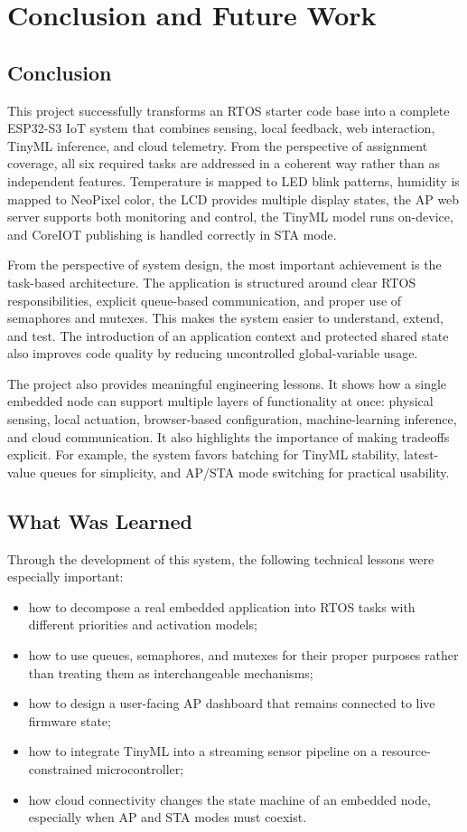 \section{Conclusion and Future Work}

\subsection{Conclusion}
This project successfully transforms an RTOS starter code base into a complete
ESP32-S3 IoT system that combines sensing, local feedback, web interaction,
TinyML inference, and cloud telemetry. From the perspective of assignment
coverage, all six required tasks are addressed in a coherent way rather than as
independent features. Temperature is mapped to LED blink patterns, humidity is
mapped to NeoPixel color, the LCD provides multiple display states, the AP web
server supports both monitoring and control, the TinyML model runs on-device,
and CoreIOT publishing is handled correctly in STA mode.

From the perspective of system design, the most important achievement is the
task-based architecture. The application is structured around clear RTOS
responsibilities, explicit queue-based communication, and proper use of
semaphores and mutexes. This makes the system easier to understand, extend, and
test. The introduction of an application context and protected shared state also
improves code quality by reducing uncontrolled global-variable usage.

The project also provides meaningful engineering lessons. It shows how a single
embedded node can support multiple layers of functionality at once: physical
sensing, local actuation, browser-based configuration, machine-learning
inference, and cloud communication. It also highlights the importance of making
tradeoffs explicit. For example, the system favors batching for TinyML
stability, latest-value queues for simplicity, and AP/STA mode switching for
practical usability.

\subsection{What Was Learned}
Through the development of this system, the following technical lessons were
especially important:
\begin{itemize}
  \item how to decompose a real embedded application into RTOS tasks with
  different priorities and activation models;
  \item how to use queues, semaphores, and mutexes for their proper purposes
  rather than treating them as interchangeable mechanisms;
  \item how to design a user-facing AP dashboard that remains connected to live
  firmware state;
  \item how to integrate TinyML into a streaming sensor pipeline on a resource-
  constrained microcontroller;
  \item how cloud connectivity changes the state machine of an embedded node,
  especially when AP and STA modes must coexist.
\end{itemize}

